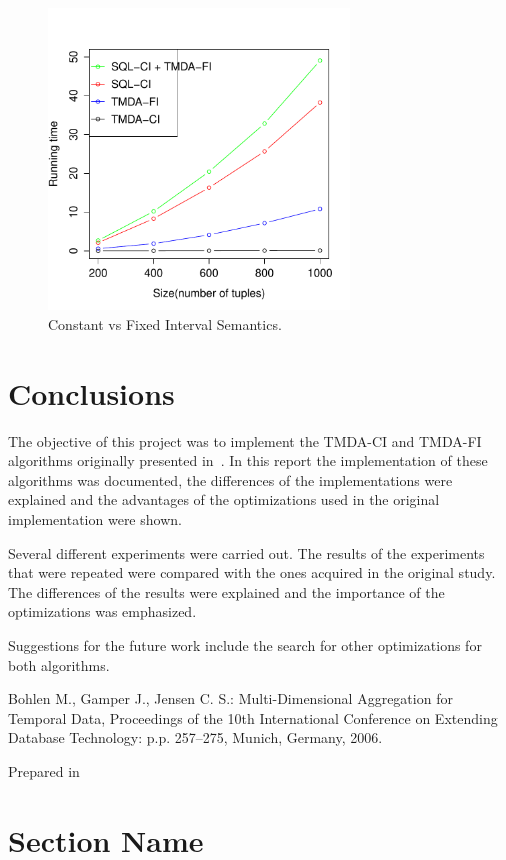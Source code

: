 \documentclass[a4paper,11pt]{article}
\begin{document}
\begin{figure}[ht!]
\centering 
\includegraphics[width=80mm]{../graphs/sql_tmda_fi.pdf}
\caption{Constant vs Fixed Interval Semantics.}
\label{sql_tmda_fi} 
\end{figure}

\section{Conclusions}

The objective of this project was to implement the TMDA-CI and TMDA-FI algorithms  originally presented in~\cite{bohlen}. In this report the implementation of these algorithms was documented, the differences of the implementations were explained and the advantages of the optimizations used in the original implementation were shown. 

Several different experiments were carried out. The results of the experiments that were repeated were compared with the ones acquired in the original study. The differences of the results were explained and the importance of the optimizations was emphasized.

Suggestions for the future work include the search for other optimizations for both algorithms.


\begin{thebibliography}{9999}
Bohlen M., Gamper J., Jensen C. S.: Multi-Dimensional Aggregation for Temporal Data,
Proceedings of the 10th International Conference on Extending Database Technology: p.p. 257–275, Munich, Germany, 2006.
\end{thebibliography}
\vfill
\begin{flushright}\small Prepared in \LaTeXe\ \end{flushright}

\appendix
\section{Section Name}
\end{document}
